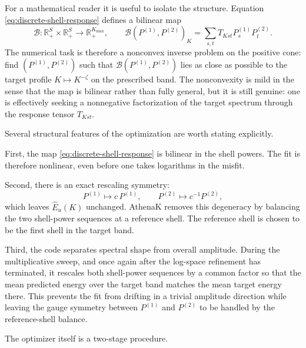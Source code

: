 \documentclass[11pt]{article}
\begin{document}
For a mathematical reader it is useful to isolate the structure. Equation \eqref{eq:discrete-shell-response} defines a bilinear map
\begin{equation}
\mathcal{B}:\mathbb{R}_+^{S}\times \mathbb{R}_+^{S}\to \mathbb{R}_+^{K_{\max}},
\qquad
\mathcal{B}(P^{(1)},P^{(2)})_K
=
\sum_{s,t} T_{Kst}P_s^{(1)}P_t^{(2)}.
\end{equation}
The numerical task is therefore a nonconvex inverse problem on the positive cone: find $(P^{(1)},P^{(2)})$ such that $\mathcal{B}(P^{(1)},P^{(2)})$ lies as close as possible to the target profile $K\mapsto K^{-\zeta}$ on the prescribed band. The nonconvexity is mild in the sense that the map is bilinear rather than fully general, but it is still genuine: one is effectively seeking a nonnegative factorization of the target spectrum through the response tensor $T_{Kst}$.

Several structural features of the optimization are worth stating explicitly.

First, the map \eqref{eq:discrete-shell-response} is bilinear in the shell powers. The fit is therefore nonlinear, even before one takes logarithms in the misfit.

Second, there is an exact rescaling symmetry:
\begin{equation}
P^{(1)} \mapsto c\,P^{(1)},
\qquad
P^{(2)} \mapsto c^{-1}P^{(2)},
\end{equation}
which leaves $\widehat{E}_u(K)$ unchanged. AthenaK removes this degeneracy by
balancing the two shell-power sequences at a reference shell. The reference shell
is chosen to be the first shell in the target band.

Third, the code separates spectral shape from overall amplitude. During the multiplicative sweep, and once again after the log-space refinement has terminated, it rescales both shell-power sequences by a common factor so that the mean predicted energy over the target band matches the mean target energy there. This prevents the fit from drifting in a trivial amplitude direction while leaving the gauge symmetry between $P^{(1)}$ and $P^{(2)}$ to be handled by the reference-shell balance.

The optimizer itself is a two-stage procedure.
\end{document}
